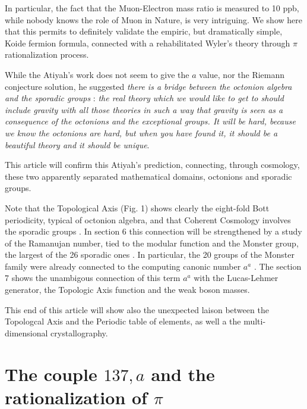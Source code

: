 \documentclass[a4paper,9pt]{article}
\begin{document}
      
   In particular, the fact that the Muon-Electron mass ratio is measured to 10 ppb, while nobody knows the role of Muon in Nature, is very intriguing. We show here that this permits to definitely validate the empiric, but dramatically simple, Koide fermion formula, connected with a rehabilitated Wyler's theory through $\pi$ rationalization process. 
   
   
   While the Atiyah's work does not seem to give the $a$ value, nor the Riemann conjecture solution, he suggested \cite{Atiyah1} \textit{there is a bridge between the octonion algebra and the sporadic groups} : \textit {the real theory which we would like to get to should include gravity with all those theories in such a way that gravity is seen as a consequence of the octonions and the exceptional groups. It will be hard, because we know the octonions are hard, but when you have found it, it should be a beautiful theory and it should be unique}. 
   
   
   
   This article will confirm this Atiyah's prediction, connecting, through cosmology, these two apparently separated mathematical domains, octonions and sporadic groups.
   
   
   
   Note that the Topological Axis (Fig. 1) shows clearly the eight-fold Bott periodicity, typical of octonion algebra, and that Coherent Cosmology involves the sporadic groups \cite{Sanchez}. In section 6 this connection will be strengthened by a study of the Ramanujan number, tied to the modular function and the Monster group, the largest of the 26 sporadic ones \cite{Conway} \cite{Borcherds}. In particular, the 20 groups of the Monster family were already connected to the computing canonic number $a^a$ \cite{Sanchez}. The section 7 shows the unambigous connection of this term $a^a$ with the Lucas-Lehmer generator, the Topologic Axis function and the weak boson masses.  
   
   
   This end of this article will show also the unexpected laison between the Topologcal Axis and the Periodic table of elements, as well a the multi-dimensional crystallography.
   
   
   
   \section {The couple $137, a$ and the rationalization of $\pi$ }
   
\end{document}
